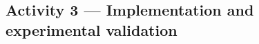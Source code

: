 \documentclass[letterpaper, 11 pt, onecolumn]{article}
\begin{document}

\subsection{Activity 3 --- Implementation and experimental validation}\label{sec:plan-evaluation}

\noindent

\noindent

\end{document}
